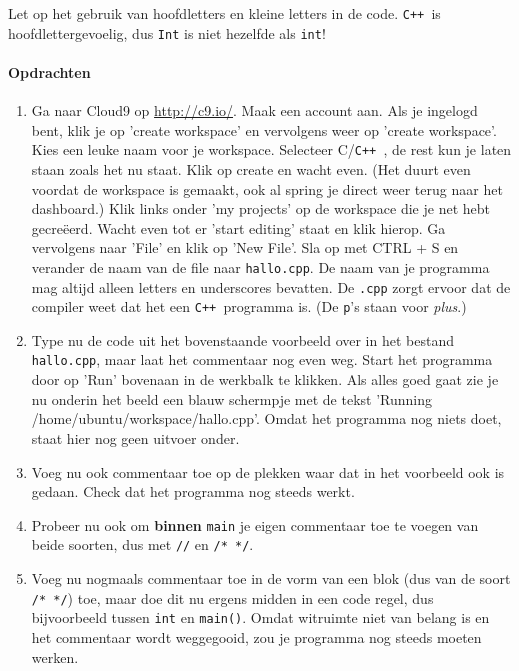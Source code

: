 \documentclass[12pt,a4paper]{article}
\newcommand{\icode}{\lstinline}
\newcommand{\mono}{\texttt}
\newcommand{\cpp}{\mono{C++ }}
\begin{document}
Let op het gebruik van hoofdletters en kleine letters in de code. \cpp is hoofdlettergevoelig, dus \icode{Int} is niet hezelfde als \icode{int}!


\paragraph{Opdrachten}
\begin{enumerate}
	\item
		Ga naar Cloud9 op \url{http://c9.io/}. Maak een account aan. Als je ingelogd bent, klik je op 'create workspace' en vervolgens weer op 'create workspace'. Kies een leuke naam voor je workspace. Selecteer C/\cpp, de rest kun je laten staan zoals het nu staat. Klik op create en wacht even. (Het duurt even voordat de workspace is gemaakt, ook al spring je direct weer terug naar het dashboard.) Klik links onder 'my projects' op de workspace die je net hebt gecreëerd. Wacht even tot er 'start editing' staat en klik hierop. Ga vervolgens naar 'File' en klik op 'New File'. Sla op met CTRL + S en verander de naam van de file naar \mono{hallo.cpp}. De naam van je programma mag altijd alleen letters en underscores bevatten. De \mono{.cpp} zorgt ervoor dat de compiler weet dat het een \cpp programma is. (De \mono{p}'s staan voor \emph{plus}.)
		
	\item 
		Type nu de code uit het bovenstaande voorbeeld over in het bestand \mono{hallo.cpp}, maar laat het commentaar nog even weg. Start het programma door op 'Run' bovenaan in de werkbalk te klikken. Als alles goed gaat zie je nu onderin het beeld een blauw schermpje met de tekst 'Running /home/ubuntu/workspace/hallo.cpp'. Omdat het programma nog niets doet, staat hier nog geen uitvoer onder.
	\item
		Voeg nu ook commentaar toe op de plekken waar dat in het voorbeeld ook is gedaan. Check dat het programma nog steeds werkt.
	\item
		Probeer nu ook om \textbf{binnen} \icode{main} je eigen commentaar toe te voegen van beide soorten, dus met \icode{//} en \icode{/* */}.
	\item 
		Voeg nu nogmaals commentaar toe in de vorm van een blok (dus van de soort \icode{/* */}) toe, maar doe dit nu ergens midden in een code regel, dus bijvoorbeeld tussen \icode{int} en \icode{main()}. Omdat witruimte niet van belang is en het commentaar wordt weggegooid, zou je programma nog steeds moeten werken.
\end{enumerate}
\end{document}

